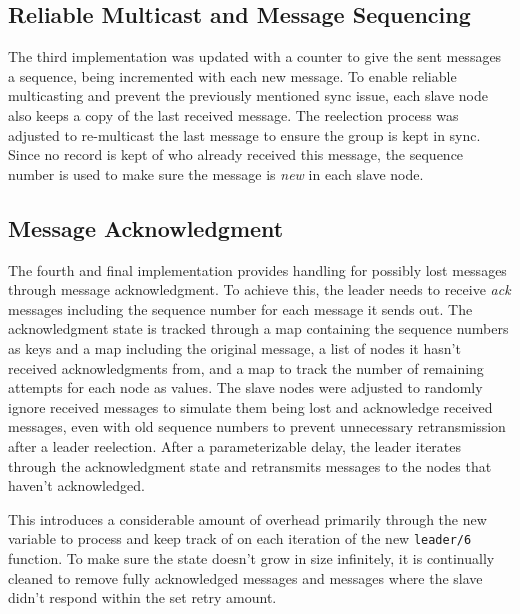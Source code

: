 \documentclass[a4paper, 11pt]{article}
\begin{document}

\subsection{Reliable Multicast and Message Sequencing}

The third implementation was updated with a counter to give the sent messages a sequence, being incremented with each new message.
To enable reliable multicasting and prevent the previously mentioned sync issue, each slave node also keeps a copy of the last received message.
The reelection process was adjusted to re-multicast the last message to ensure the group is kept in sync.
Since no record is kept of who already received this message, the sequence number is used to make sure the message is \textit{new} in each slave node.



\subsection{Message Acknowledgment}

The fourth and final implementation provides handling for possibly lost messages through message acknowledgment.
To achieve this, the leader needs to receive \textit{ack} messages including the sequence number for each message it sends out.
The acknowledgment state is tracked through a map containing the sequence numbers as keys and a map including the original message,
a list of nodes it hasn't received acknowledgments from, and a map to track the number of remaining attempts for each node as values.
The slave nodes were adjusted to randomly ignore received messages to simulate them being lost and acknowledge received messages, even with old sequence numbers to prevent unnecessary retransmission after a leader reelection.
After a parameterizable delay, the leader iterates through the acknowledgment state and retransmits messages to the nodes that haven't acknowledged.

This introduces a considerable amount of overhead primarily through the new variable to process and keep track of on each iteration of the new \texttt{leader/6} function.
To make sure the state doesn't grow in size infinitely, it is continually cleaned to remove fully acknowledged messages and messages where the slave didn't respond within the set retry amount.
\end{document}
